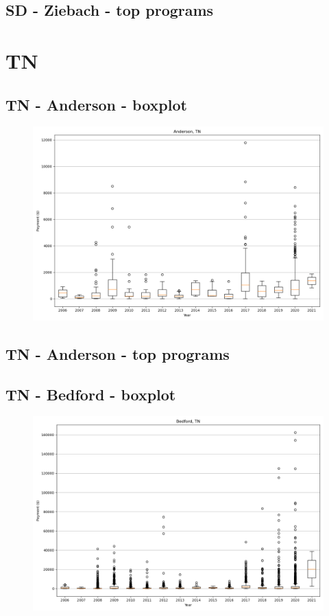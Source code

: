 \subsection*{SD - Ziebach - top programs}

\newpage
\section*{TN}
\subsection*{TN - Anderson - boxplot}
\begin{figure}[h]
\centering
\includegraphics[width=7in]{../output/boxplots/counties/Anderson-TN_boxplot.png}
\end{figure}


\subsection*{TN - Anderson - top programs}

\newpage
\subsection*{TN - Bedford - boxplot}
\begin{figure}[h]
\centering
\includegraphics[width=7in]{../output/boxplots/counties/Bedford-TN_boxplot.png}
\end{figure}


